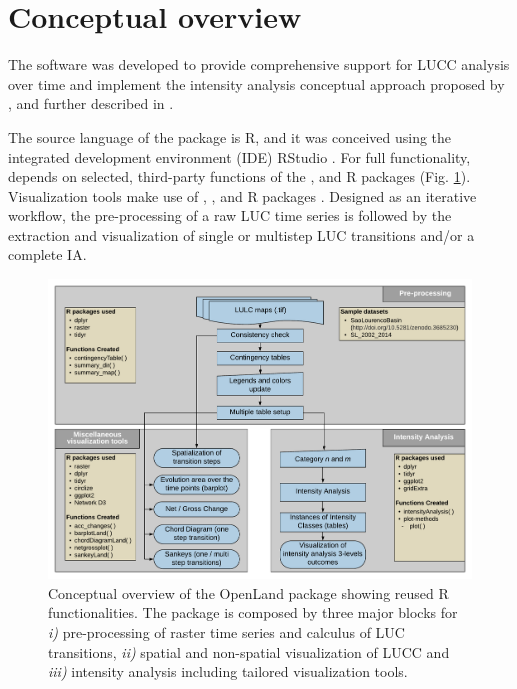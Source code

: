 \hypertarget{conceptual-overview}{%
\section{Conceptual overview}\label{conceptual-overview}}

The software was developed to provide comprehensive support for LUCC
analysis over time and implement the intensity analysis conceptual
approach proposed by \citet{Aldwaik2012}, and further described in
\citet{Aldwaik2013}.

The source language of the  package \citep{Exavier2020} is R,
and it was conceived using the integrated development environment (IDE)
RStudio \citep{RStudioTeam2016}. For full functionality, 
depends on selected, third-party functions of the ,
 and  R packages
\citep{Hijmans2019, Wickham2019, Wickham2019a} (Fig.
\ref{fig:conception}). Visualization tools make use of ,
,  and
 R packages
\citep{Allaire2017, Auguie2017, Gu2014, Wickham2016}. Designed
as an iterative workflow, the pre-processing of a raw LUC time series is
followed by the extraction and visualization of single or multistep LUC
transitions and/or a complete IA.

\begin{Schunk}
\begin{figure}[h]

{\centering \includegraphics[width=1\linewidth,trim={0 0.5cm 0 0.5cm},clip]{figures/conception_overview.pdf} 

}

\caption[Conceptual overview]{Conceptual overview of the OpenLand package showing reused R functionalities. The package is composed by three major blocks for \textit{i)} pre-processing of raster time series and calculus of LUC transitions, \textit{ii)} spatial and non-spatial visualization of LUCC and \textit{iii)} intensity analysis including tailored visualization tools.}\label{fig:conception}
\end{figure}
\end{Schunk}

